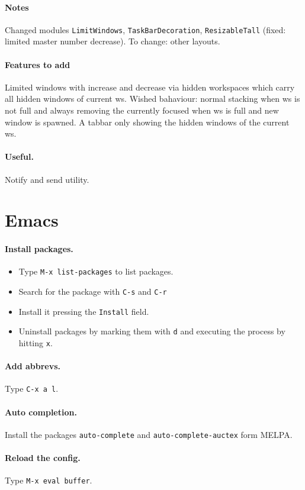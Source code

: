 \documentclass{article}
\begin{document}
\paragraph{Notes}
Changed modules \texttt{LimitWindows}, \texttt{TaskBarDecoration}, \texttt{ResizableTall} (fixed: limited master number decrease).
To change: other layouts.

\paragraph{Features to add}
Limited windows with increase and decrease via hidden workspaces which carry all hidden windows of current ws. Wished bahaviour: normal stacking when ws is not full and always removing the currently focused when ws is full and new window is spawned.
A tabbar only showing the hidden windows of the current ws.

\paragraph{Useful.} Notify and send utility.

\section{Emacs}

\paragraph{Install packages.}
\begin{itemize}
        \item Type \texttt{M-x list-packages} to list packages.
        \item Search for the package with \texttt{C-s} and \texttt{C-r}
        \item Install it pressing the \texttt{Install} field.
        \item Uninstall packages by marking them with \texttt{d} and executing the process by hitting \texttt{x}.
\end{itemize}

\paragraph{Add abbrevs.} Type \texttt{C-x a l}.

\paragraph{Auto completion.} Install the packages \texttt{auto-complete} and \texttt{auto-complete-auctex} form MELPA.

\paragraph{Reload the config.} Type \texttt{M-x eval buffer}.
\end{document}
